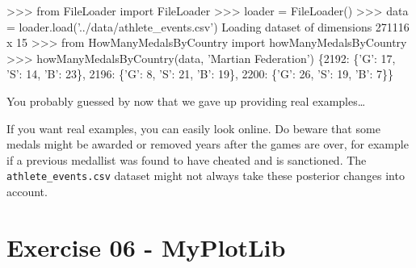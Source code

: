 \documentclass[]{article}
\newenvironment{Shaded}{\begin{snugshade}}{\end{snugshade}}
\newcommand{\DecValTok}[1]{\textcolor[rgb]{0.96,0.45,0.00}{#1}}
\newcommand{\ImportTok}[1]{\textcolor[rgb]{0.15,0.68,0.38}{#1}}
\newcommand{\NormalTok}[1]{\textcolor[rgb]{0.81,0.81,0.76}{#1}}
\newcommand{\OperatorTok}[1]{\textcolor[rgb]{0.81,0.81,0.76}{#1}}
\newcommand{\StringTok}[1]{\textcolor[rgb]{0.96,0.31,0.31}{#1}}
\begin{document}
\begin{Shaded}
\begin{Highlighting}[]
\OperatorTok{>>>} \ImportTok{from}\NormalTok{ FileLoader }\ImportTok{import}\NormalTok{ FileLoader}
\OperatorTok{>>>}\NormalTok{ loader }\OperatorTok{=}\NormalTok{ FileLoader()}
\OperatorTok{>>>}\NormalTok{ data }\OperatorTok{=}\NormalTok{ loader.load(}\StringTok{'../data/athlete_events.csv'}\NormalTok{)}
\NormalTok{Loading dataset of dimensions }\DecValTok{271116}\NormalTok{ x }\DecValTok{15}
\OperatorTok{>>>} \ImportTok{from}\NormalTok{ HowManyMedalsByCountry }\ImportTok{import}\NormalTok{ howManyMedalsByCountry}
\OperatorTok{>>>}\NormalTok{ howManyMedalsByCountry(data, }\StringTok{'Martian Federation'}\NormalTok{)}
\NormalTok{\{}\DecValTok{2192}\NormalTok{: \{}\StringTok{'G'}\NormalTok{: }\DecValTok{17}\NormalTok{, }\StringTok{'S'}\NormalTok{: }\DecValTok{14}\NormalTok{, }\StringTok{'B'}\NormalTok{: }\DecValTok{23}\NormalTok{\}, }\DecValTok{2196}\NormalTok{: \{}\StringTok{'G'}\NormalTok{: }\DecValTok{8}\NormalTok{, }\StringTok{'S'}\NormalTok{: }\DecValTok{21}\NormalTok{, }\StringTok{'B'}\NormalTok{: }\DecValTok{19}\NormalTok{\}, }\DecValTok{2200}\NormalTok{: \{}\StringTok{'G'}\NormalTok{: }\DecValTok{26}\NormalTok{, }\StringTok{'S'}\NormalTok{: }\DecValTok{19}\NormalTok{, }\StringTok{'B'}\NormalTok{: }\DecValTok{7}\NormalTok{\}\}}
\end{Highlighting}
\end{Shaded}

You probably guessed by now that we gave up providing real
examples\ldots{}

If you want real examples, you can easily look online. Do beware that
some medals might be awarded or removed years after the games are over,
for example if a previous medallist was found to have cheated and is
sanctioned. The \texttt{athlete\_events.csv} dataset might not always
take these posterior changes into account.

\clearpage

\hypertarget{exercise-06---myplotlib-1}{%
\section{Exercise 06 - MyPlotLib}\label{exercise-06---myplotlib-1}}
\end{document}
